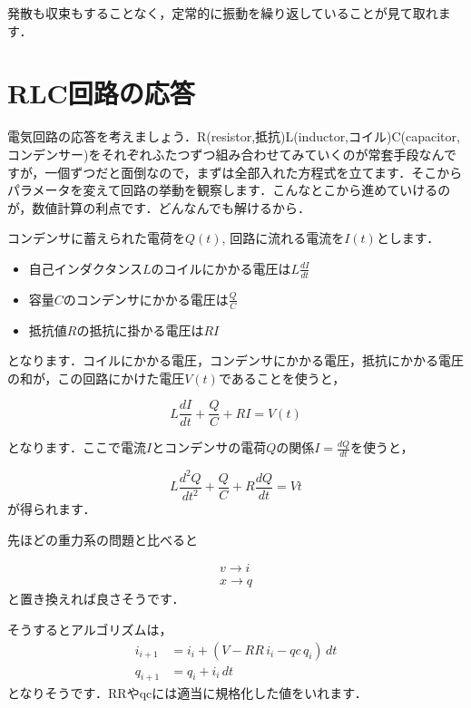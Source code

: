 \documentclass[11pt,dvipdfmx]{jsarticle}
\providecommand{\tightlist}{%
      \setlength{\itemsep}{0pt}\setlength{\parskip}{0pt}}
\begin{document}
発散も収束もすることなく，定常的に振動を繰り返していることが見て取れます．

    \section{RLC回路の応答}\label{rlcux56deux8defux306eux5fdcux7b54}

電気回路の応答を考えましょう．R(resistor,抵抗)L(inductor,コイル)C(capacitor,コンデンサー)をそれぞれふたつずつ組み合わせてみていくのが常套手段なんですが，一個ずつだと面倒なので，まずは全部入れた方程式を立てます．そこからパラメータを変えて回路の挙動を観察します．こんなとこから進めていけるのが，数値計算の利点です．どんなんでも解けるから．

コンデンサに蓄えられた電荷を\(Q(t)\),
回路に流れる電流を\(I(t)\)とします．

\begin{itemize}
\tightlist
\item
  自己インダクタンス\(L\)のコイルにかかる電圧は\(L \frac{dI}{dt}\)
\item
  容量\(C\)のコンデンサにかかる電圧は\(\frac{Q}{C}\)
\item
  抵抗値\(R\)の抵抗に掛かる電圧は\(RI\)
\end{itemize}

となります．コイルにかかる電圧，コンデンサにかかる電圧，抵抗にかかる電圧の和が，この回路にかけた電圧\(V(t)\)であることを使うと，

\[
L \frac{dI}{dt} + \frac{Q}{C} + RI = V(t)
\]

となります．ここで電流\(I\)とコンデンサの電荷\(Q\)の関係\(I=\frac{dQ}{dt}\)を使うと，

\[
L \frac{d^2Q}{dt^2} + \frac{Q}{C} + R\frac{dQ}{dt} = V{t}
\] が得られます．

先ほどの重力系の問題と比べると

\[
\begin{aligned}
v \rightarrow i \\
x \rightarrow q
\end{aligned}
\] と置き換えれば良さそうです．

そうするとアルゴリズムは， \[
\begin{aligned}
i_{i+1} & = i_i + (V - RR \, i_i -qc \, q_i) \, dt \\
q_{i+1} & = q_i + i_i \, dt
\end{aligned}
\] となりそうです．RRやqcには適当に規格化した値をいれます．
\end{document}

